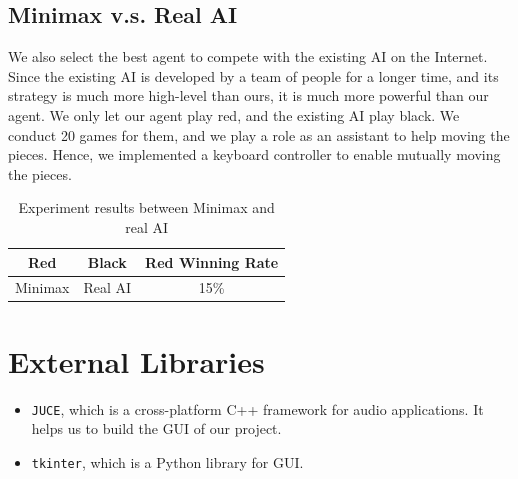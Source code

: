 \documentclass[letterpaper]{article}
\begin{document}
    \subsection{Minimax v.s. Real AI}
    \label{subsec:minimax-v.s.-real-ai}
    We also select the best agent to compete with the existing AI on the Internet.
    Since the existing AI is developed by a team of people for a longer time, and its strategy is much more high-level than ours, it is much more powerful than our agent.
    We only let our agent play red, and the existing AI play black.
    We conduct 20 games for them, and we play a role as an assistant to help moving the pieces.
    Hence, we implemented a keyboard controller to enable mutually moving the pieces.
    \begin{table}[htbp]
        \centering
        \caption{Experiment results between Minimax and real AI}
        \label{tab:tab3}
        \begin{tabular}{|c|c|c|}
            \hline
            Red     & Black   & Red Winning Rate \\ \hline
            Minimax & Real AI & 15\%             \\ \hline
        \end{tabular}
    \end{table}


    \section{External Libraries}\label{sec:acknowledgements}

    \begin{itemize}
        \item \texttt{JUCE}, which is a cross-platform C++ framework for audio applications.
        It helps us to build the GUI of our project.
        \item \texttt{tkinter}, which is a Python library for GUI\@.
    \end{itemize}

    
    
\end{document}
